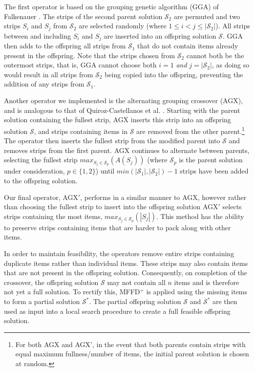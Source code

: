 \documentclass{elsarticle}
\begin{document}
The first operator is based on the grouping genetic algorithm (GGA) of Falkenauer \cite{falkenauer1992}. The strips of the second parent solution $\mathcal{S}_2$ are permuted and two strips $S_i$ and $S_j$ from $\mathcal{S}_2$ are selected randomly (where $1 \leq i < j \leq |\mathcal{S}_2|$). All strips between and including $S_i$ and $S_j$ are inserted into an offspring solution $\mathcal{S}$. GGA then adds to the offspring all strips from $\mathcal{S}_1$ that do not contain items already present in the offspring. Note that the strips chosen from $\mathcal{S}_2$ cannot both be the outermost strips, that is, GGA cannot choose both $i = 1$ \emph{and} $j = |\mathcal{S}_2|$, as doing so would result in all strips from $\mathcal{S}_2$ being copied into the offspring, preventing the addition of any strips from $\mathcal{S}_1$. 

Another operator we implemented is the alternating grouping crossover (AGX), and is analogous to that of Quiroz-Castellanos et al. \cite{quiroz2015}. Starting with the parent solution containing the fullest strip, AGX inserts this strip into an offspring solution $\mathcal{S}$, and strips containing items in $\mathcal{S}$ are removed from the other parent.\footnote{For both AGX and AGX', in the event that both parents contain strips with equal maximum fullness/number of items, the initial parent solution is chosen at random.} The operator then inserts the fullest strip from the modified parent into $\mathcal{S}$ and removes strips from the first parent. AGX continues to alternate between parents, selecting the fullest strip $max_{S_j \in \mathcal{S}_p} (A(S_j))$ (where $\mathcal{S}_p$ is the parent solution under consideration, $p \in \{1,2\}$) until $min (|\mathcal{S}_1|,|\mathcal{S}_2|) - 1$ strips have been added to the offspring solution. 

Our final operator, AGX$'$, performs in a similar manner to AGX, however rather than choosing the fullest strip to insert into the offspring solution AGX$'$ selects strips containing the most items, $max_{S_j \in \mathcal{S}_p} (|S_j|)$. This method has the ability to preserve strips containing items that are harder to pack along with other items. 

In order to maintain feasibility, the operators remove entire strips containing duplicate items rather than individual items. These strips may also contain items that are not present in the offspring solution. Consequently, on completion of the crossover, the offspring solution $\mathcal{S}$ may not contain all $n$ items and is therefore not yet a full solution. To rectify this, MFFD$^+$ is applied using the missing items to form a partial solution $\mathcal{S}^*$. The partial offspring solution $\mathcal{S}$ and $\mathcal{S}^*$ are then used as input into a local search procedure to create a full feasible offspring solution.
\end{document}
